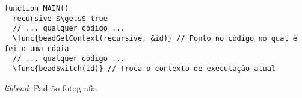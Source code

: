 \begin{pseudocode}
\begin{lstlisting}[language=pseudocode, style=pseudocode]
function MAIN()
  recursive $\gets$ true
  // ... qualquer código ...
  \func{beadGetContext(recursive, &id)} // Ponto no código no qual é feito uma cópia
  // ... qualquer código ...
  \func{beadSwitch(id)} // Troca o contexto de executação atual

\end{lstlisting}

  \caption{\emph{libbead}: Padrão fotografia}
  \label{alg:libBeadFotografia}
\end{pseudocode}

